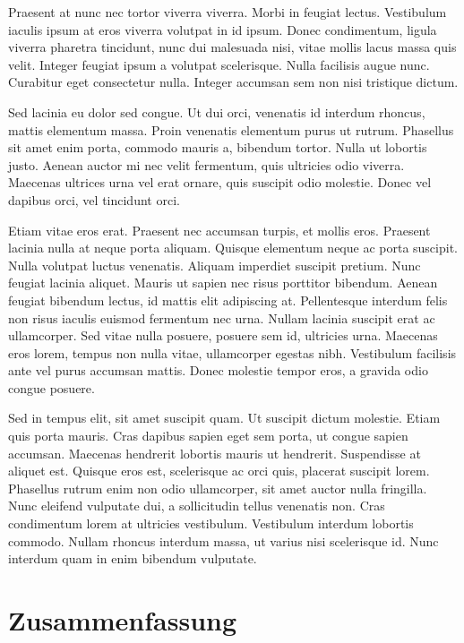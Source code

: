\documentclass[12pt,oneside,a4paper,parskip]{scrbook}
\begin{document}
Praesent at nunc nec tortor viverra viverra. Morbi in feugiat lectus. Vestibulum iaculis ipsum at eros viverra volutpat in id ipsum. Donec condimentum, ligula viverra pharetra tincidunt, nunc dui malesuada nisi, vitae mollis lacus massa quis velit. Integer feugiat ipsum a volutpat scelerisque. Nulla facilisis augue nunc. Curabitur eget consectetur nulla. Integer accumsan sem non nisi tristique dictum.

Sed lacinia eu dolor sed congue. Ut dui orci, venenatis id interdum rhoncus, mattis elementum massa. Proin venenatis elementum purus ut rutrum. Phasellus sit amet enim porta, commodo mauris a, bibendum tortor. Nulla ut lobortis justo. Aenean auctor mi nec velit fermentum, quis ultricies odio viverra. Maecenas ultrices urna vel erat ornare, quis suscipit odio molestie. Donec vel dapibus orci, vel tincidunt orci.

Etiam vitae eros erat. Praesent nec accumsan turpis, et mollis eros. Praesent lacinia nulla at neque porta aliquam. Quisque elementum neque ac porta suscipit. Nulla volutpat luctus venenatis. Aliquam imperdiet suscipit pretium. Nunc feugiat lacinia aliquet. Mauris ut sapien nec risus porttitor bibendum. Aenean feugiat bibendum lectus, id mattis elit adipiscing at. Pellentesque interdum felis non risus iaculis euismod fermentum nec urna. Nullam lacinia suscipit erat ac ullamcorper. Sed vitae nulla posuere, posuere sem id, ultricies urna. Maecenas eros lorem, tempus non nulla vitae, ullamcorper egestas nibh. Vestibulum facilisis ante vel purus accumsan mattis. Donec molestie tempor eros, a gravida odio congue posuere.

Sed in tempus elit, sit amet suscipit quam. Ut suscipit dictum molestie. Etiam quis porta mauris. Cras dapibus sapien eget sem porta, ut congue sapien accumsan. Maecenas hendrerit lobortis mauris ut hendrerit. Suspendisse at aliquet est. Quisque eros est, scelerisque ac orci quis, placerat suscipit lorem. Phasellus rutrum enim non odio ullamcorper, sit amet auctor nulla fringilla. Nunc eleifend vulputate dui, a sollicitudin tellus venenatis non. Cras condimentum lorem at ultricies vestibulum. Vestibulum interdum lobortis commodo. Nullam rhoncus interdum massa, ut varius nisi scelerisque id. Nunc interdum quam in enim bibendum vulputate.

\chapter{Zusammenfassung}


\backmatter
\end{document}
